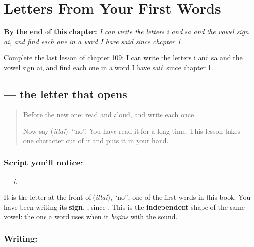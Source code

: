
\chapter{Letters From Your First Words}
\label{ch:ta-letters-from-first-words}

\begin{chapteropening}
\textbf{By the end of this chapter:} \emph{I can write the letters i and sa and the vowel sign ai, and find each one in a word I have said since chapter 1.}

Complete the last lesson of chapter 109: I can write the letters i and sa and the vowel sign ai, and find each one in a word I have said since chapter 1.
\end{chapteropening}

\section[\texorpdfstring{\ta{இ} (i)}{இ (i)}]{ — the letter that opens }

\label{lesson:TA-S127-letter-i}



\begin{quote}
Before the new one: read  and  aloud, and write each once.

Now say \textbf{} (\emph{illai}), \textquotedblleft{}no\textquotedblright{}. You have read it for a long time. This lesson takes one character out of it and puts it in your hand.
\end{quote}

\subsection*{Script you'll notice: }
\textbf{} — \emph{i}.

It is the letter at the front of \textbf{} (\emph{illai}), \textquotedblleft{}no\textquotedblright{}, one of the first words in this book. You have been writing its \textbf{sign}, , since . This is the \textbf{independent} shape of the same vowel: the one a word uses when it \emph{begins} with the sound.

\subsection*{Writing: }

